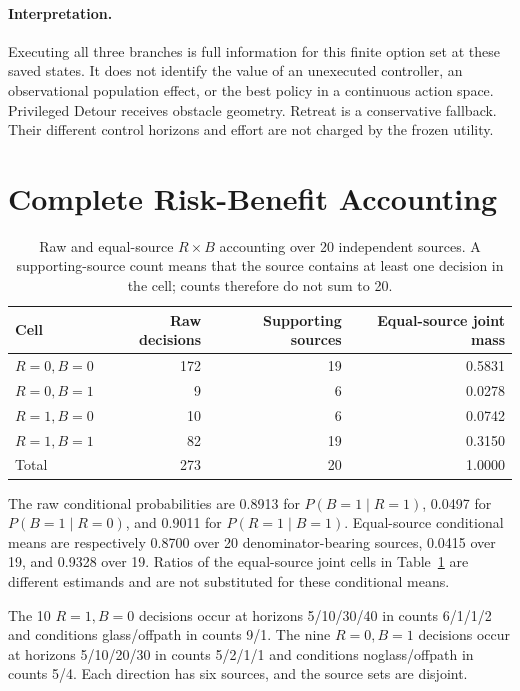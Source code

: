 \paragraph{Interpretation.}
Executing all three branches is full information for this finite option set at
these saved states. It does not identify the value of an unexecuted controller,
an observational population effect, or the best policy in a continuous action
space. Privileged Detour receives obstacle geometry. Retreat is a conservative
fallback. Their different control horizons and effort are not charged by the
frozen utility.

\section{Complete Risk-Benefit Accounting}
\label{app:risk-benefit}

\begin{table}[H]
\centering
\small
\begin{tabular}{@{}lrrr@{}}
\toprule
Cell & Raw decisions & Supporting sources & Equal-source joint mass \\
\midrule
$R=0,B=0$ & 172 & 19 & 0.5831 \\
$R=0,B=1$ & 9 & 6 & 0.0278 \\
$R=1,B=0$ & 10 & 6 & 0.0742 \\
$R=1,B=1$ & 82 & 19 & 0.3150 \\
\midrule
Total & 273 & 20 & 1.0000 \\
\bottomrule
\end{tabular}
\caption{Raw and equal-source $R\times B$ accounting over 20 independent
sources. A supporting-source
count means that the source contains at least one decision in the cell; counts
therefore do not sum to 20.}
\label{tab:rb-full}
\end{table}

The raw conditional probabilities are 0.8913 for $P(B=1\mid R=1)$, 0.0497 for
$P(B=1\mid R=0)$, and 0.9011 for $P(R=1\mid B=1)$. Equal-source conditional
means are respectively 0.8700 over 20 denominator-bearing sources, 0.0415 over
19, and 0.9328 over 19. Ratios of the equal-source joint cells in
Table~\ref{tab:rb-full} are different estimands and are not substituted for
these conditional means.

The 10 $R=1,B=0$ decisions occur at horizons 5/10/30/40 in counts 6/1/1/2 and
conditions glass/offpath in counts 9/1. The nine $R=0,B=1$ decisions occur at
horizons 5/10/20/30 in counts 5/2/1/1 and conditions noglass/offpath in counts
5/4. Each direction has six sources, and the source sets are disjoint.

